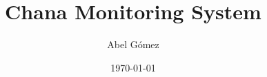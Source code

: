 \documentclass[twoside]{report}
\title{%
  Chana Monitoring System%
}
\author{
  Abel Gómez
}
\date{
  \today
}
\begin{document}
\maketitle

\tableofcontents

%








\appendix

\cleardoublepage








% 
% 
% 
% 
% 
% 


\makeback
\end{document}
